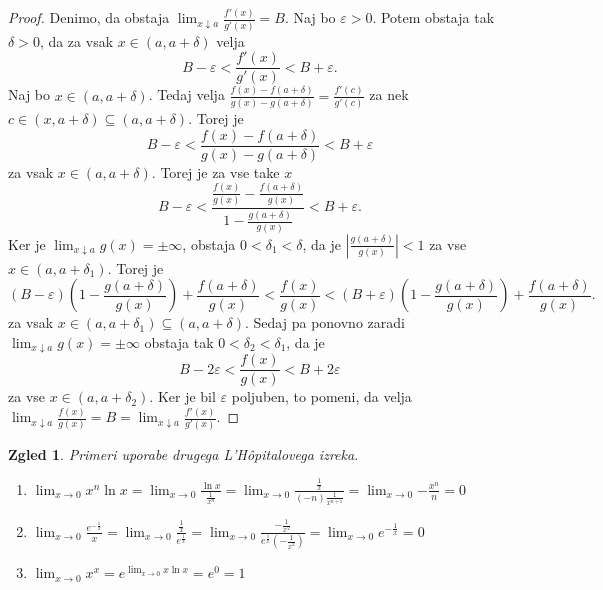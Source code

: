 \documentclass[10pt, a4paper]{article}
\newtheorem{zgled}[izr]{Zgled}
\newenvironment{noticeC}{%
  \tcolorbox[%
  notitle,
  empty,
  enhanced,  %
  breakable,
  coltext=black, 
  fontupper=\rmfamily,
  noparskip,
  sharp corners,
  boxrule=-1pt,  %
  frame hidden,
  left=7pt,  %
  right=7pt,
  top=5pt,
  bottom=5pt,
  before skip=2.5ex plus 2pt,
  after skip=2.5ex plus 2pt,
  overlay unbroken and last={%
  },
  ]}
{\endtcolorbox}
\newenvironment{dokaz}%
  {\begin{noticeC}\begin{proof}}%
  {\end{proof}\end{noticeC}}
\newcommand{\limf}[3]{\lim_{#1 \to #2} {#3}}
\newcommand{\rlimf}[3]{\lim_{#1 \downarrow #2} {#3}}
\begin{document}
\begin{dokaz}
    Denimo, da obstaja $\rlimf{x}{a}{\frac{f'(x)}{g'(x)}} = B.$
    Naj bo $\varepsilon > 0$.
    Potem obstaja tak $\delta > 0$, da za vsak $x \in (a, a + \delta)$ velja
    $$B - \varepsilon < \frac{f'(x)}{g'(x)} < B + \varepsilon.$$
    Naj bo $x \in (a, a + \delta)$.
    Tedaj velja
    $\frac{f(x) - f(a + \delta)}{g(x) - g(a + \delta)} = \frac{f'(c)}{g'(c)}$
    za nek $c \in (x, a + \delta) \subseteq (a, a + \delta)$.
    Torej je 
    $$B - \varepsilon < \frac{f(x) - f(a + \delta)}{g(x) - g(a + \delta)} < B + \varepsilon$$
    za vsak $x \in (a, a + \delta).$
    Torej je za vse take $x$
    $$B - \varepsilon < \frac{\frac{f(x)}{g(x)} - \frac{f(a + \delta)}{g(x)}}{1 - \frac{g(a + \delta)}{g(x)}} < B + \varepsilon.$$
    Ker je $\rlimf{x}{a}{g(x)} = \pm \infty$, obstaja $0 < \delta_1 < \delta$, da je
    $\left| \frac{g(a + \delta)}{g(x)} \right| < 1$
    za vse $x \in (a, a + \delta_1)$.
    Torej je
    $$(B - \varepsilon)\left(1 - \frac{g(a + \delta)}{g(x)}\right) + \frac{f(a + \delta)}{g(x)} < \frac{f(x)}{g(x)} < (B + \varepsilon)\left(1 - \frac{g(a + \delta)}{g(x)}\right) + \frac{f(a + \delta)}{g(x)}.$$
    za vsak $x \in (a, a + \delta_1) \subseteq (a, a + \delta)$.
    Sedaj pa ponovno zaradi $\rlimf{x}{a}{g(x)} = \pm \infty$ obstaja tak $0 < \delta_2 < \delta_1$, da je
    $$B - 2 \varepsilon < \frac{f(x)}{g(x)} < B + 2 \varepsilon$$
    za vse $x \in (a, a + \delta_2)$.
    Ker je bil $\varepsilon$ poljuben, to pomeni, da velja
    $
        \rlimf{x}{a}{\frac{f(x)}{g(x)}} = B = \rlimf{x}{a}{\frac{f'(x)}{g'(x)}}
    $.
\end{dokaz}

\begin{zgled}
    Primeri uporabe drugega L'Hôpitalovega izreka.
    \begin{enumerate}
        \item $\displaystyle \limf{x}{0}{x^n \ln x} = \limf{x}{0}{\frac{\ln x}{\frac{1}{x^n}}} = \limf{x}{0}{\frac{\frac{1}{x}}{(-n) \frac{1}{x^{n+1}}}} = \limf{x}{0}{-\frac{x^n}{n}} = 0$
        \item $\displaystyle \limf{x}{0}{\frac{e^{-\frac{1}{x}}}{x}} = \limf{x}{0}{\frac{\frac{1}{x}}{e^{\frac{1}{x}}}} = \limf{x}{0}{\frac{-\frac{1}{x^2}}{e^{\frac{1}{x}} (-\frac{1}{x^2})}} = \limf{x}{0}{e^{-\frac{1}{x}}} = 0$
        \item $\displaystyle \limf{x}{0}{x^x} = e^{\limf{x}{0}{x \ln x}} = e^0 = 1$
    \end{enumerate}
\end{zgled}
\end{document}
